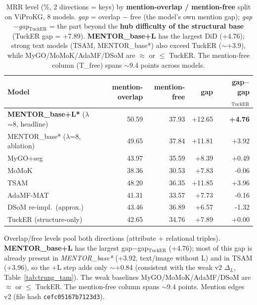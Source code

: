 \begin{table}[t]
\centering
\footnotesize
\setlength{\tabcolsep}{5pt}
\caption{MRR level (\%, 2 directions = keys) by \textbf{mention-overlap / mention-free} split on ViProKG, 8 models. \emph{gap} = overlap $-$ free (the model's own mention gap); \emph{gap$-$gap$_{\text{TuckER}}$} = the part beyond the \textbf{hub difficulty of the structural base} (TuckER gap = +7.89). \textbf{MENTOR\_base+L} has the largest DiD (+4.76); strong text models (TSAM, MENTOR\_base*) also exceed TuckER ($\sim$+3.9), while MyGO/MoMoK/AdaMF/DSoM are $\approx$ or $\le$ TuckER. The mention-free column (T\_free) spans $\sim$9.4 points across models.}
\label{tab:canh_v2}
\begin{tabular}{l r r r r}
\toprule
Model & mention-overlap & mention-free & gap & gap$-$gap$_{\text{TuckER}}$ \\
\midrule
\textbf{MENTOR\_base+L*} ($\lambda$=8, headline) & 50.59 & 37.93 & +12.65 & \textbf{+4.76} \\
MENTOR\_base* ($\lambda$=8, ablation) & 49.65 & 37.84 & +11.81 & +3.92 \\
MyGO+seg & 43.97 & 35.59 & +8.39 & +0.49 \\
MoMoK & 38.36 & 30.53 & +7.83 & -0.06 \\
TSAM & 48.20 & 36.35 & +11.85 & +3.96 \\
AdaMF-MAT & 41.31 & 33.57 & +7.73 & -0.16 \\
DSoM re-impl.\ (approx.) & 43.46 & 36.89 & +6.57 & -1.32 \\
TuckER (structure-only) & 42.65 & 34.76 & +7.89 & +0.00 \\
\bottomrule
\end{tabular}
\vspace{2pt}
\begin{minipage}{\linewidth}\footnotesize\raggedright
Overlap/free levels pool both directions (attribute + relational triples). \textbf{MENTOR\_base+L} has the largest gap$-$gap$_{\text{TuckER}}$ (+4.76); most of this gap is already present in \emph{MENTOR\_base*} (+3.92, text/image without L) and in TSAM (+3.96), so the +L step adds only $\sim$+0.84 (consistent with the weak v2 $\Delta_L$, Table~\ref{tab:trung_tam}). The weak baselines MyGO/MoMoK/AdaMF/DSoM are $\approx$ or $\le$ TuckER. The mention-free column spans $\sim$9.4 points. Mention edges v2 (file hash \texttt{cefc05167b7123d3}).
\end{minipage}
\end{table}
